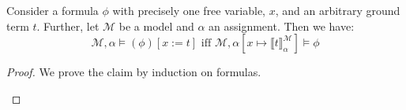 \begin{enumerate}[\thesection.1]
          \begin{lemma}
            Consider a formula $\phi$ with precisely one free
            variable, $x$, and an arbitrary ground term $t$. Further,
            let $\mathcal{M}$ be a model and
            $\alpha$ an assignment. Then we have:
            \[\mathcal{M},\alpha\vDash (\phi)[x:=t]\text{ iff
              }\mathcal{M},\alpha[x\mapsto \llbracket
              t\rrbracket^\mathcal{M}_\alpha]\vDash \phi\]
          \end{lemma}

          \begin{proof}

            We prove the claim by induction on formulas.

            \begin{enumerate}[(i)]


\end{enumerate}
\end{proof}
\end{enumerate}
